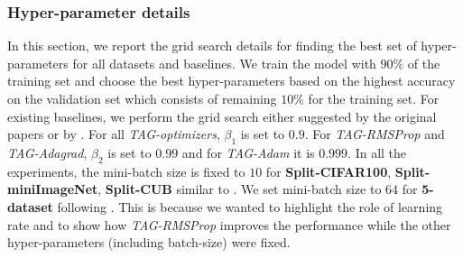 \documentclass{article} \usepackage{collas2022_conference,times}
\begin{document}
\subsubsection{Hyper-parameter details}\label{hyper} 
In this section, we report the grid search details for finding the best set of hyper-parameters for all datasets and baselines. We train the model with $90\%$ of the training set and choose the best hyper-parameters based on the highest accuracy on the validation set which consists of remaining $10\%$ for the training set. For existing baselines, we perform the grid search either suggested by the original papers or by \cite{farajtabar2020orthogonal}. For all \textit{TAG-optimizers}, $\beta_1$ is set to $0.9$. For \textit{TAG-RMSProp} and \textit{TAG-Adagrad}, $\beta_2$ is set to $0.99$ and for \textit{TAG-Adam} it is $0.999$. In all the experiments, the mini-batch size is fixed to $10$ for \textbf{Split-CIFAR100}, \textbf{Split-miniImageNet}, \textbf{Split-CUB} similar to \citep{chaudhry2019tiny,mirzadeh2020understanding}. We set mini-batch size to $64$ for \textbf{5-dataset} following \citep{serra2018overcoming}. This is because we wanted to highlight the role of learning rate and to show how \textit{TAG-RMSProp} improves the performance while the other hyper-parameters (including batch-size) were fixed. 
\end{document}

